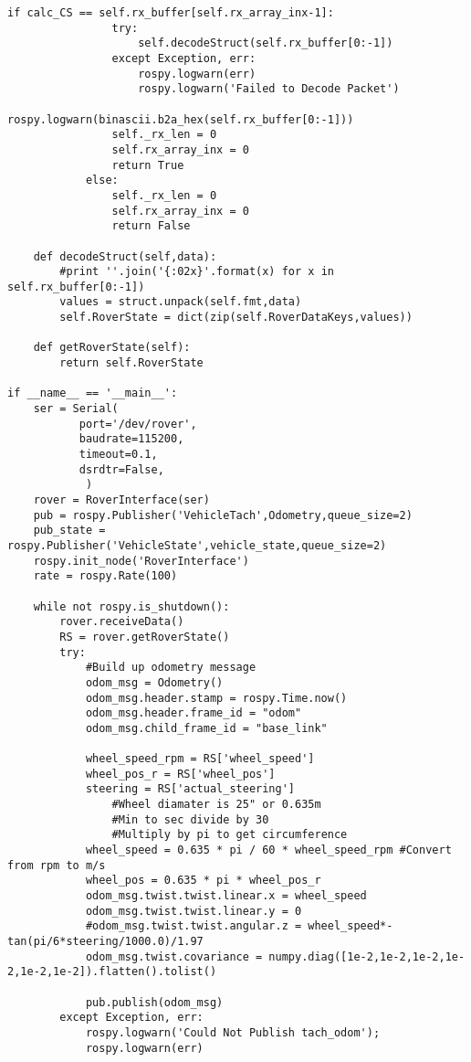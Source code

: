 \begin{lstlisting}[breaklines=true,basicstyle=\tiny]
            if calc_CS == self.rx_buffer[self.rx_array_inx-1]:
                try:
                    self.decodeStruct(self.rx_buffer[0:-1])
                except Exception, err:
                    rospy.logwarn(err)
                    rospy.logwarn('Failed to Decode Packet')
                    rospy.logwarn(binascii.b2a_hex(self.rx_buffer[0:-1]))
                self._rx_len = 0
                self.rx_array_inx = 0
                return True
            else:
                self._rx_len = 0
                self.rx_array_inx = 0
                return False

    def decodeStruct(self,data):
        #print ''.join('{:02x}'.format(x) for x in self.rx_buffer[0:-1])
        values = struct.unpack(self.fmt,data)
        self.RoverState = dict(zip(self.RoverDataKeys,values))

    def getRoverState(self):
        return self.RoverState

if __name__ == '__main__':
    ser = Serial(
           port='/dev/rover',
           baudrate=115200,
           timeout=0.1,
           dsrdtr=False,
            )
    rover = RoverInterface(ser)
    pub = rospy.Publisher('VehicleTach',Odometry,queue_size=2)
    pub_state = rospy.Publisher('VehicleState',vehicle_state,queue_size=2)
    rospy.init_node('RoverInterface')
    rate = rospy.Rate(100)

    while not rospy.is_shutdown():
        rover.receiveData()
        RS = rover.getRoverState()
        try:
            #Build up odometry message
            odom_msg = Odometry()
            odom_msg.header.stamp = rospy.Time.now()
            odom_msg.header.frame_id = "odom"
            odom_msg.child_frame_id = "base_link"
            
            wheel_speed_rpm = RS['wheel_speed']
            wheel_pos_r = RS['wheel_pos']
            steering = RS['actual_steering']
                #Wheel diamater is 25" or 0.635m
                #Min to sec divide by 30
                #Multiply by pi to get circumference
            wheel_speed = 0.635 * pi / 60 * wheel_speed_rpm #Convert from rpm to m/s
            wheel_pos = 0.635 * pi * wheel_pos_r
            odom_msg.twist.twist.linear.x = wheel_speed
            odom_msg.twist.twist.linear.y = 0
            #odom_msg.twist.twist.angular.z = wheel_speed*-tan(pi/6*steering/1000.0)/1.97
            odom_msg.twist.covariance = numpy.diag([1e-2,1e-2,1e-2,1e-2,1e-2,1e-2]).flatten().tolist()

            pub.publish(odom_msg)
        except Exception, err:
            rospy.logwarn('Could Not Publish tach_odom');
            rospy.logwarn(err)


\end{lstlisting}
